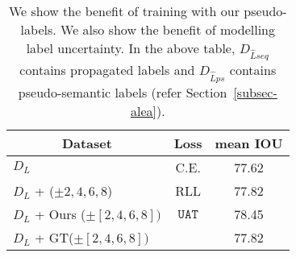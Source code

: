 




\begin{table}[t]
    \centering
    \caption{ We show the benefit of training with our pseudo-labels. We also show the benefit of modelling label uncertainty. In the above table,  $D_{\hat{L}seq}$ contains propagated labels and $D_{\hat{L}ps}$ contains pseudo-semantic labels (refer Section~\ref{subsec-alea}).
    }\label{tab_main_ablation}
    \begin{tabular}{llcc}
\toprule
\multicolumn{2}{c}{Dataset}& Loss & mean IOU  \\
\midrule
\multicolumn{2}{l}{$D_L$} & C.E. & 77.62\\
\multicolumn{2}{l}{$D_L$ + \cite{nvidia_cvpr19} ($\pm 2,4,6,8$)}& RLL &77.82  \\
\multicolumn{2}{l}{$D_L$ + Ours ($\pm [2,4,6,8])$}&$\mathtt{UAT}$ & 78.45  \\
\midrule
\multicolumn{2}{l}{$D_L$ + GT($\pm [2,4,6,8])$}& \cite{gal_main} & 77.82  \\
\bottomrule
    \end{tabular}
\end{table}
 
